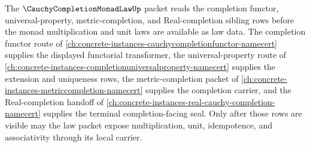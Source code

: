The $\CauchyCompletionMonadLawUp$ packet reads the completion functor, universal-property, metric-completion, and Real-completion sibling rows before the monad multiplication and unit laws are available as law data. The completion functor route of \autoref{ch:concrete-instances-cauchycompletionfunctor-namecert} supplies the displayed functorial transformer, the universal-property route of \autoref{ch:concrete-instances-completionuniversalproperty-namecert} supplies the extension and uniqueness rows, the metric-completion packet of \autoref{ch:concrete-instances-metriccompletion-namecert} supplies the completion carrier, and the Real-completion handoff of \autoref{ch:concrete-instances-real-cauchy-completion-namecert} supplies the terminal completion-facing seal. Only after those rows are visible may the law packet expose multiplication, unit, idempotence, and associativity through its local carrier.
